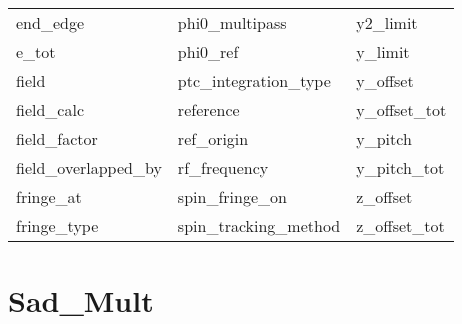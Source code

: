 \begin{tabular}{lll}
end_edge                    & phi0_multipass              & y2_limit                    \\
e_tot                       & phi0_ref                    & y_limit                     \\
field                       & ptc_integration_type        & y_offset                    \\
field_calc                  & reference                   & y_offset_tot                \\
field_factor                & ref_origin                  & y_pitch                     \\
field_overlapped_by         & rf_frequency                & y_pitch_tot                 \\
fringe_at                   & spin_fringe_on              & z_offset                    \\
fringe_type                 & spin_tracking_method        & z_offset_tot                \\
 \bottomrule
 \end{tabular}
 \vfill
 
 \section{Sad_Mult}
 \label{s:list.sad.mult}
 

